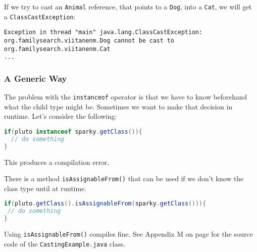 If we try to cast an \texttt{Animal} reference, that points to a \texttt{Dog}, into a \texttt{Cat}, we will get a \texttt{ClassCastException}:
\begin{lstlisting}
Exception in thread "main" java.lang.ClassCastException: org.familysearch.viitanenm.Dog cannot be cast to org.familysearch.viitanenm.Cat
...
\end{lstlisting}

\subsubsection{A Generic Way}

The problem with the \texttt{instanceof} operator is that we have to know beforehand what the child type might be. Sometimes we want to make that decision in runtime. Let's consider the following:

\begin{lstlisting}[language=Java]
if(pluto instanceof sparky.getClass()){
  // do something
}
\end{lstlisting}

This produces a compilation error. 

There is a method \texttt{isAssignableFrom()} that can be used if we don't know the class type until at runtime.
\begin{lstlisting}[language=Java]
if(pluto.getClass().isAssignableFrom(sparky.getClass())){
 // do something
}
\end{lstlisting}

Using \texttt{isAssignableFrom()} compiles fine. See Appendix M on page \pageref{App:AppendixM} for the source code of the \texttt{CastingExample.java} class.